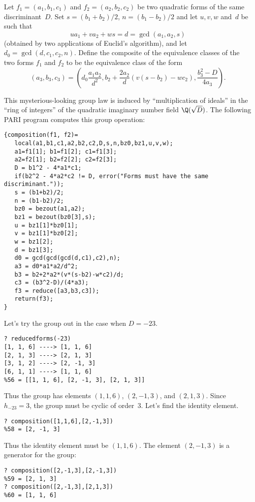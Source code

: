 \documentclass[11pt]{report}
\begin{document}
\begin{definition}
  Let $f_1=(a_1,b_1,c_1)$ and $f_2=(a_2,b_2,c_2)$ be two
  quadratic forms of the same discriminant~$D$.  Set
  $s=(b_1+b_2)/2$, $n=(b_1-b_2)/2$ and let $u,v,w$ and~$d$
  be such that
  $$
    u a_1 + v a_2 + w s = d = \gcd(a_1, a_2, s)
  $$
  (obtained by two applications of Euclid's algorithm), and let
  $d_0 = \gcd(d,c_1,c_2,n)$.  Define the composite of the equivalence
  classes of the two forms $f_1$ and $f_2$ to be
  the equivalence class of the form
  $$
    (a_3, b_3, c_3) = \left(
    d_0 \frac{a_1 a_2}{d^2},
    b_2 + \frac{2a_2}{d}(v(s-b_2)-w c_2),
    \frac{b_3^2-D}{4a_3}\right).
  $$
\end{definition}
This mysterious-looking group law is induced by ``multiplication
of ideals'' in the ``ring of integers'' of the quadratic imaginary
number field $\Q(\sqrt{D})$.
The following PARI program computes this group operation:
\begin{verbatim}
{composition(f1, f2)=
   local(a1,b1,c1,a2,b2,c2,D,s,n,bz0,bz1,u,v,w);
   a1=f1[1]; b1=f1[2]; c1=f1[3];
   a2=f2[1]; b2=f2[2]; c2=f2[3];   
   D = b1^2 - 4*a1*c1;
   if(b2^2 - 4*a2*c2 != D, error("Forms must have the same discriminant."));
   s = (b1+b2)/2;
   n = (b1-b2)/2;
   bz0 = bezout(a1,a2);
   bz1 = bezout(bz0[3],s);
   u = bz1[1]*bz0[1];
   v = bz1[1]*bz0[2];
   w = bz1[2];
   d = bz1[3];
   d0 = gcd(gcd(gcd(d,c1),c2),n);
   a3 = d0*a1*a2/d^2;
   b3 = b2+2*a2*(v*(s-b2)-w*c2)/d;
   c3 = (b3^2-D)/(4*a3);
   f3 = reduce([a3,b3,c3]);
   return(f3);
}
\end{verbatim}
Let's try the group out in the case when $D=-23$.

\begin{verbatim}
? reducedforms(-23)
[1, 1, 6] ----> [1, 1, 6]
[2, 1, 3] ----> [2, 1, 3]
[3, 1, 2] ----> [2, -1, 3]
[6, 1, 1] ----> [1, 1, 6]
%56 = [[1, 1, 6], [2, -1, 3], [2, 1, 3]]
\end{verbatim}
Thus the group has elements $(1,1,6)$, $(2,-1,3)$, and $(2,1,3)$.
Since $h_{-23}=3$,
the group must be cyclic of order~$3$.  Let's find the identity element.
\begin{verbatim}
? composition([1,1,6],[2,-1,3])
%58 = [2, -1, 3]
\end{verbatim}
Thus the identity element must be $(1,1,6)$.
The element $(2,-1,3)$ is a generator for the group:
\begin{verbatim}
? composition([2,-1,3],[2,-1,3])
%59 = [2, 1, 3]
? composition([2,-1,3],[2,1,3])
%60 = [1, 1, 6]
\end{verbatim}
\end{document}
